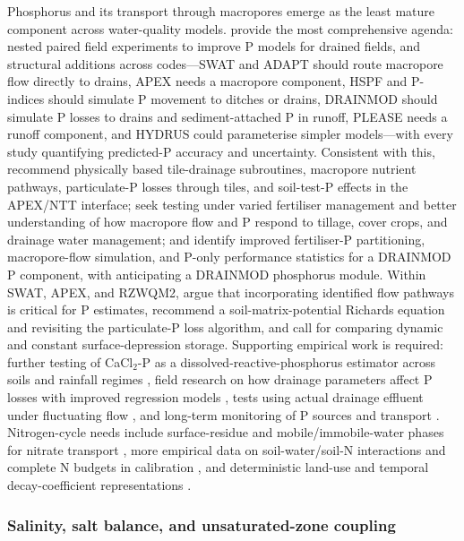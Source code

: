 \documentclass[11pt]{article}
\begin{document}
Phosphorus and its transport through macropores emerge as the least mature
component across water-quality models. \textcite{Radcliffe2015} provide the most
comprehensive agenda: nested paired field experiments to improve P models for
drained fields, and structural additions across codes---SWAT and ADAPT should
route macropore flow directly to drains, APEX needs a macropore component, HSPF
and P-indices should simulate P movement to ditches or drains, DRAINMOD should
simulate P losses to drains and sediment-attached P in runoff, PLEASE needs a
runoff component, and HYDRUS could parameterise simpler models---with every
study quantifying predicted-P accuracy and uncertainty. Consistent with this,
\textcite{Guo2020b} recommend physically based tile-drainage subroutines,
macropore nutrient pathways, particulate-P losses through tiles, and
soil-test-P effects in the APEX/NTT interface; \textcite{Ford2017} seek testing
under varied fertiliser management and better understanding of how macropore
flow and P respond to tillage, cover crops, and drainage water management; and
\textcite{BinShokrana2023b} identify improved fertiliser-P partitioning,
macropore-flow simulation, and P-only performance statistics for a DRAINMOD P
component, with \textcite{Gowda2012} anticipating a DRAINMOD phosphorus module.
Within SWAT, APEX, and RZWQM2, \textcite{Williams2016} argue that incorporating
identified flow pathways is critical for P estimates, \textcite{Qi2018}
recommend a soil-matrix-potential Richards equation and revisiting the
particulate-P loss algorithm, and \textcite{Moriasi2012} call for comparing
dynamic and constant surface-depression storage. Supporting empirical work is
required: further testing of CaCl$_2$-P as a dissolved-reactive-phosphorus
estimator across soils and rainfall regimes \parencite{McDowell2001b}, field
research on how drainage parameters affect P losses with improved regression
models \parencite{Morrison2013}, tests using actual drainage effluent under
fluctuating flow \parencite{Sanford2016}, and long-term monitoring of P sources
and transport \parencite{Jia2012}. Nitrogen-cycle needs include surface-residue
and mobile/immobile-water phases for nitrate transport \parencite{Malone2017},
more empirical data on soil-water/soil-N interactions and complete N budgets in
calibration \parencite{Gillette2018}, and deterministic land-use and temporal
decay-coefficient representations \parencite{Rudra2005}.

\subsubsection{Salinity, salt balance, and unsaturated-zone coupling}
\end{document}
